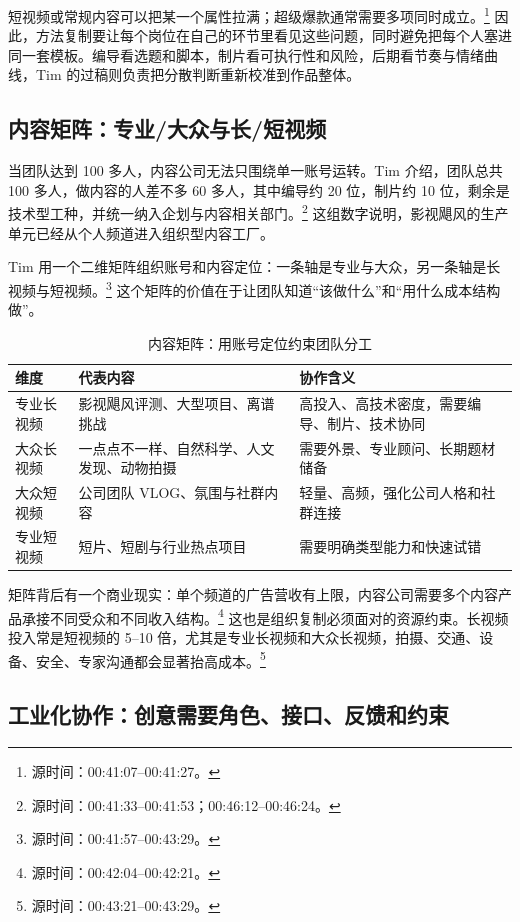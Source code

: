 短视频或常规内容可以把某一个属性拉满；超级爆款通常需要多项同时成立。\footnote{源时间：00:41:07--00:41:27。} 因此，方法复制要让每个岗位在自己的环节里看见这些问题，同时避免把每个人塞进同一套模板。编导看选题和脚本，制片看可执行性和风险，后期看节奏与情绪曲线，Tim 的过稿则负责把分散判断重新校准到作品整体。

\subsection{内容矩阵：专业/大众与长/短视频}

当团队达到 100 多人，内容公司无法只围绕单一账号运转。Tim 介绍，团队总共 100 多人，做内容的人差不多 60 多人，其中编导约 20 位，制片约 10 位，剩余是技术型工种，并统一纳入企划与内容相关部门。\footnote{源时间：00:41:33--00:41:53；00:46:12--00:46:24。} 这组数字说明，影视飓风的生产单元已经从个人频道进入组织型内容工厂。

Tim 用一个二维矩阵组织账号和内容定位：一条轴是专业与大众，另一条轴是长视频与短视频。\footnote{源时间：00:41:57--00:43:29。} 这个矩阵的价值在于让团队知道“该做什么”和“用什么成本结构做”。

\begin{table}[htbp]
  \centering
  \caption{内容矩阵：用账号定位约束团队分工}
  \label{tab:content-matrix}
  \begin{tabular}{lll}
    \toprule
    维度 & 代表内容 & 协作含义 \\
    \midrule
    专业长视频 & 影视飓风评测、大型项目、离谱挑战 & 高投入、高技术密度，需要编导、制片、技术协同 \\
    大众长视频 & 一点点不一样、自然科学、人文发现、动物拍摄 & 需要外景、专业顾问、长期题材储备 \\
    大众短视频 & 公司团队 VLOG、氛围与社群内容 & 轻量、高频，强化公司人格和社群连接 \\
    专业短视频 & 短片、短剧与行业热点项目 & 需要明确类型能力和快速试错 \\
    \bottomrule
  \end{tabular}
\end{table}

矩阵背后有一个商业现实：单个频道的广告营收有上限，内容公司需要多个内容产品承接不同受众和不同收入结构。\footnote{源时间：00:42:04--00:42:21。} 这也是组织复制必须面对的资源约束。长视频投入常是短视频的 5--10 倍，尤其是专业长视频和大众长视频，拍摄、交通、设备、安全、专家沟通都会显著抬高成本。\footnote{源时间：00:43:21--00:43:29。}

\subsection{工业化协作：创意需要角色、接口、反馈和约束}

